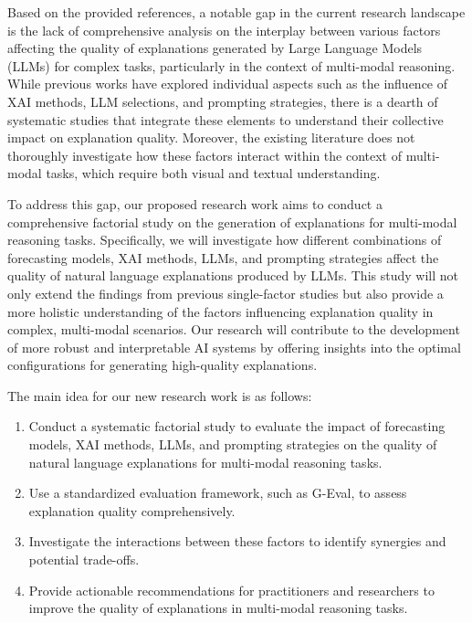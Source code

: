 Based on the provided references, a notable gap in the current research landscape is the lack of comprehensive analysis on the interplay between various factors affecting the quality of explanations generated by Large Language Models (LLMs) for complex tasks, particularly in the context of multi-modal reasoning. While previous works have explored individual aspects such as the influence of XAI methods, LLM selections, and prompting strategies, there is a dearth of systematic studies that integrate these elements to understand their collective impact on explanation quality. Moreover, the existing literature does not thoroughly investigate how these factors interact within the context of multi-modal tasks, which require both visual and textual understanding.

To address this gap, our proposed research work aims to conduct a comprehensive factorial study on the generation of explanations for multi-modal reasoning tasks. Specifically, we will investigate how different combinations of forecasting models, XAI methods, LLMs, and prompting strategies affect the quality of natural language explanations produced by LLMs. This study will not only extend the findings from previous single-factor studies but also provide a more holistic understanding of the factors influencing explanation quality in complex, multi-modal scenarios. Our research will contribute to the development of more robust and interpretable AI systems by offering insights into the optimal configurations for generating high-quality explanations.

The main idea for our new research work is as follows:

\begin{enumerate}
    \item Conduct a systematic factorial study to evaluate the impact of forecasting models, XAI methods, LLMs, and prompting strategies on the quality of natural language explanations for multi-modal reasoning tasks.
    \item Use a standardized evaluation framework, such as G-Eval, to assess explanation quality comprehensively.
    \item Investigate the interactions between these factors to identify synergies and potential trade-offs.
    \item Provide actionable recommendations for practitioners and researchers to improve the quality of explanations in multi-modal reasoning tasks.
\end{enumerate}

